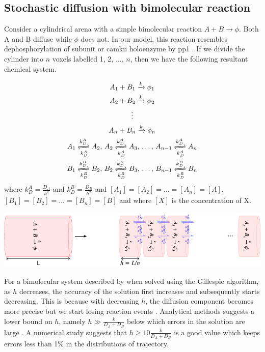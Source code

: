 \documentclass[9pt,lineno,doublespacing]{elife}
\begin{document}
\begin{appendixbox}
\subsection*{Stochastic diffusion with bimolecular reaction}\label{subsec:rdme}

Consider a cylindrical arena with a simple bimolecular reaction $A+B \rightarrow \phi$.
Both A and B diffuse while $\phi$ does not. In our model, this reaction
resembles dephosphorylation of subunit or \gls{camkii} holoenzyme by \gls{pp1} .
If we divide the cylinder into $n$ voxels labelled 1, 2, $\ldots$, $n$, then we
have the following resultant chemical system.

\begin{equation}
    \begin{gathered}
        A_1 + B_1 \xrightarrow{k} \phi_1 \\
        A_2 + B_2 \xrightarrow{k} \phi_2 \\
        \vdots \\
        A_n + B_n \xrightarrow{k} \phi_n \\
        A_1 \xrightleftharpoons[k_D^A]{k_D^A} A_2 ,\, A_2 \xrightleftharpoons[k_D^A]{k_D^A} A_3 
            ,\, \ldots,\, A_{n-1} \xrightleftharpoons[k_D^A]{k_D^A} A_n \\ 
        B_1 \xrightleftharpoons[k_D^B]{k_D^B} B_2 ,\, 
            B_2 \xrightleftharpoons[k_D^B]{k_D^B} B_3 ,\, 
            \ldots,\, B_{n-1} \xrightleftharpoons[k_D^B]{k_D^B} B_n \\ 
    \end{gathered}
    \label{eq:discrete}
\end{equation} where $k_D^A=\frac{D_A}{h^2}$ and $k_D^B=\frac{D_B}{h^2}$ and
$[A_1]=[A_2]=\ldots=[A_n]=[A]$, $[B_1]=[B_2]=\ldots=[B_n]=[B]$ 
and where $[X]$ is the concentration of X.

\begin{center}
\includegraphics[width=0.8\linewidth]{./PaperFigures/suppl/figure_diff.pdf}
\end{center}

For a bimolecular system described by  when solved using 
the Gillespie
algorithm, as $h$ decreases, the accuracy of the solution first increases 
and subsequently starts decreasing. This is because with decreasing $h$, 
the diffusion
component becomes more precise but we start losing reaction events
\citep{gardiner_correlations_1976}. Analytical methods suggests a lower bound on
$h$, namely $h\gg \frac{k}{D_A+D_B}$ below which errors in the solution are
large \citep{isaacson_reaction-diffusion_2009}. A numerical study
\citep{erban_stochastic_2009} suggests that $h\ge 10\frac{k}{D_A+D_B}$ is a good
value which keeps errors less than 1\% in the distributions of trajectory.


\end{appendixbox}
\end{document}
